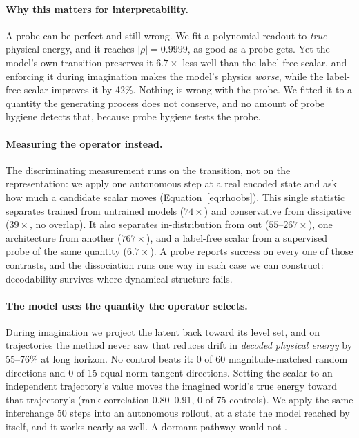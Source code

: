 \paragraph{Why this matters for interpretability.}
A probe can be perfect and still wrong. We fit a polynomial readout to \emph{true} physical energy,
and it reaches $|\rho| = 0.9999$, as good as a probe gets. Yet the model's own transition preserves
it $6.7\times$ less well than the label-free scalar, and enforcing it during imagination makes the
model's physics \emph{worse}, while the label-free scalar improves it by 42\%. Nothing is wrong with
the probe. We fitted it to a quantity the generating process does not conserve, and no amount of
probe hygiene \citep{hewitt2019control,belinkov2022probing} detects that, because probe hygiene tests
the probe.

\paragraph{Measuring the operator instead.}
The discriminating measurement runs on the transition, not on the representation: we apply one
autonomous step at a real encoded state and ask how much a candidate scalar moves
(Equation~\ref{eq:rhoobs}). This single statistic separates trained from untrained models
($74\times$) and conservative from dissipative ($39\times$, no overlap). It also separates
in-distribution from out ($55$--$267\times$), one architecture from another ($767\times$), and a
label-free scalar from a supervised probe of the same quantity ($6.7\times$). A probe reports success
on every one of those contrasts, and the dissociation runs one way in each case we can construct:
decodability survives where dynamical structure fails.

\paragraph{The model uses the quantity the operator selects.}
During imagination we project the latent back toward its level set, and on trajectories the method
never saw that reduces drift in \emph{decoded physical energy} by 55--76\% at long horizon. No
control beats it: 0 of 60 magnitude-matched random directions and 0 of 15 equal-norm tangent
directions. Setting the scalar to an independent trajectory's value moves the imagined world's true
energy toward that trajectory's (rank correlation $0.80$--$0.91$, 0 of 75 controls). We apply the
same interchange 50 steps into an autonomous rollout, at a state the model reached by itself, and it
works nearly as well. A dormant pathway would not \citep{makelov2024illusion}.

